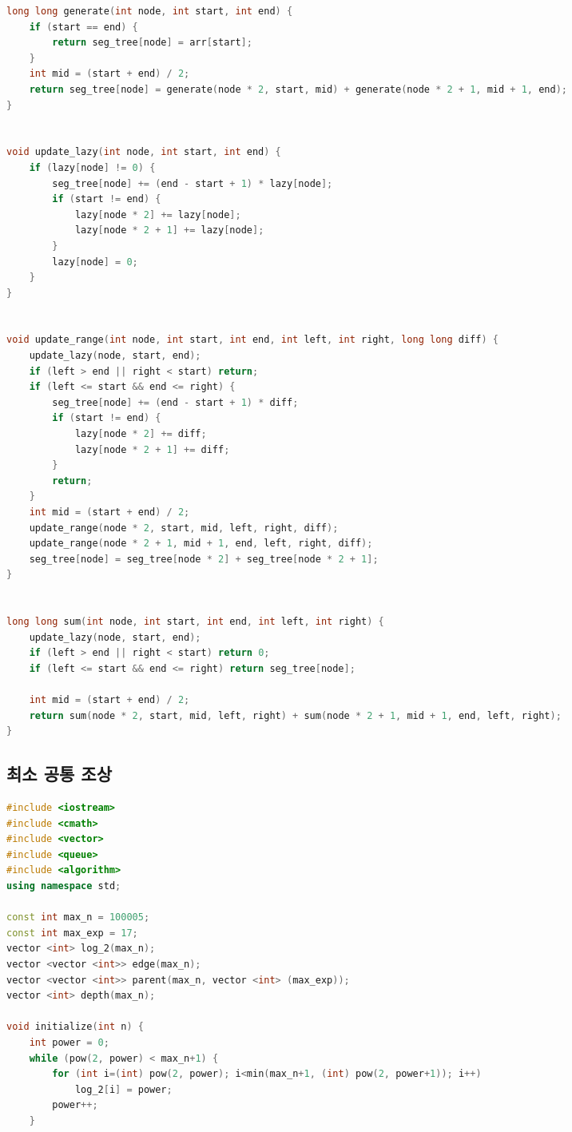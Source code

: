 \documentclass[]{article}
\begin{document}
\begin{multicols*}{2}
\begin{lstlisting}[language=c++]
long long generate(int node, int start, int end) {
    if (start == end) {
        return seg_tree[node] = arr[start];
    }
    int mid = (start + end) / 2;
    return seg_tree[node] = generate(node * 2, start, mid) + generate(node * 2 + 1, mid + 1, end);
}


void update_lazy(int node, int start, int end) {
    if (lazy[node] != 0) {
        seg_tree[node] += (end - start + 1) * lazy[node];
        if (start != end) {
            lazy[node * 2] += lazy[node];
            lazy[node * 2 + 1] += lazy[node];
        }
        lazy[node] = 0;
    }
}


void update_range(int node, int start, int end, int left, int right, long long diff) {
    update_lazy(node, start, end);
    if (left > end || right < start) return;
    if (left <= start && end <= right) {
        seg_tree[node] += (end - start + 1) * diff;
        if (start != end) {
            lazy[node * 2] += diff;
            lazy[node * 2 + 1] += diff;
        }
        return;
    }
    int mid = (start + end) / 2;
    update_range(node * 2, start, mid, left, right, diff);
    update_range(node * 2 + 1, mid + 1, end, left, right, diff);
    seg_tree[node] = seg_tree[node * 2] + seg_tree[node * 2 + 1];
}


long long sum(int node, int start, int end, int left, int right) {
    update_lazy(node, start, end);
    if (left > end || right < start) return 0;
    if (left <= start && end <= right) return seg_tree[node];

    int mid = (start + end) / 2;
    return sum(node * 2, start, mid, left, right) + sum(node * 2 + 1, mid + 1, end, left, right);
}
\end{lstlisting}
\columnbreak
\subsection{최소 공통 조상}
\begin{lstlisting}[language=c++]
#include <iostream>
#include <cmath>
#include <vector>
#include <queue>
#include <algorithm>
using namespace std;

const int max_n = 100005;
const int max_exp = 17;
vector <int> log_2(max_n);
vector <vector <int>> edge(max_n);
vector <vector <int>> parent(max_n, vector <int> (max_exp));
vector <int> depth(max_n);

void initialize(int n) {
    int power = 0;
    while (pow(2, power) < max_n+1) {
        for (int i=(int) pow(2, power); i<min(max_n+1, (int) pow(2, power+1)); i++)
            log_2[i] = power;
        power++;
    }


\end{lstlisting}
\end{multicols*}
\end{document}
